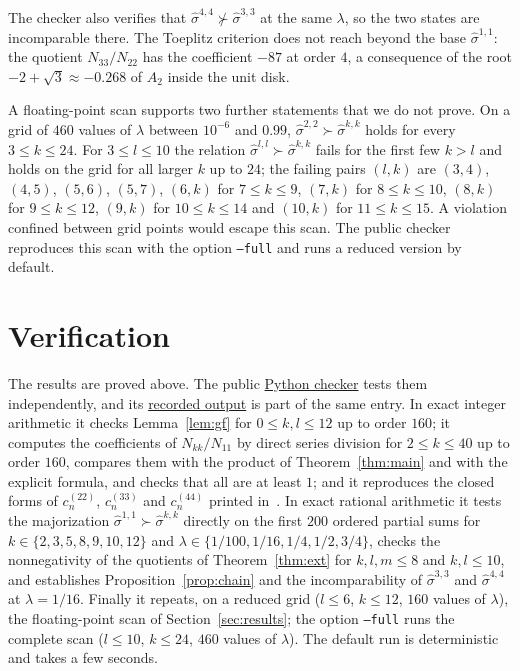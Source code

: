 \documentclass[11pt,a4paper]{article}
\theoremstyle{definition}
\theoremstyle{plain}
\newcommand{\sig}[2]{\hat\sigma^{#1,#2}}
\begin{document}
The checker also verifies that $\sig44\not\succ\sig33$ at the same $\lambda$,
so the two states are incomparable there. The Toeplitz criterion does not
reach beyond the base $\sig11$: the quotient $N_{33}/N_{22}$ has the
coefficient $-87$ at order $4$, a consequence of the root
$-2+\sqrt3\approx-0.268$ of $A_2$ inside the unit disk.

A floating-point scan supports two further statements that we do not prove. On
a grid of $460$ values of $\lambda$ between $10^{-6}$ and $0.99$, $\sig22\succ\sig kk$
holds for every $3\le k\le24$. For $3\le l\le10$ the relation $\sig ll\succ\sig kk$
fails for the first few $k>l$ and holds on the grid for all larger $k$ up to
$24$; the failing pairs $(l,k)$ are $(3,4)$, $(4,5)$, $(5,6)$, $(5,7)$, $(6,k)$
for $7\le k\le9$, $(7,k)$ for $8\le k\le10$, $(8,k)$ for $9\le k\le12$, $(9,k)$
for $10\le k\le14$ and $(10,k)$ for $11\le k\le15$. A violation confined
between grid points would escape this scan. The public checker reproduces
this scan with the option \texttt{--full} and runs a reduced version by default.

\section{Verification}\label{sec:verification}
The results are proved above. The public
\href{https://github.com/jpbruneton/open_quantum_problems/blob/main/research/entries/photon-added-squeezed-majorization/checks/verify_majorization.py}{Python checker}
tests them independently, and its
\href{https://github.com/jpbruneton/open_quantum_problems/blob/main/research/entries/photon-added-squeezed-majorization/data/verification.json}{recorded output}
is part of the same entry. In exact integer arithmetic it checks
Lemma~\ref{lem:gf} for $0\le k,l\le12$ up to order $160$; it computes the
coefficients of $N_{kk}/N_{11}$ by direct series division for $2\le k\le40$ up
to order $160$, compares them with the product of Theorem~\ref{thm:main} and
with the explicit formula, and checks that all are at least $1$; and it
reproduces the closed forms of $c^{(22)}_n$, $c^{(33)}_n$ and $c^{(44)}_n$
printed in~\cite{VanHerstraeten2024}. In exact rational arithmetic it tests the
majorization $\sig11\succ\sig kk$ directly on the first $200$ ordered partial
sums for $k\in\{2,3,5,8,9,10,12\}$ and
$\lambda\in\{1/100,1/16,1/4,1/2,3/4\}$, checks the nonnegativity of the
quotients of Theorem~\ref{thm:ext} for $k,l,m\le8$ and $k,l\le10$, and
establishes Proposition~\ref{prop:chain} and the incomparability of
$\sig33$ and $\sig44$ at $\lambda=1/16$. Finally it repeats, on a reduced grid
($l\le6$, $k\le12$, $160$ values of $\lambda$), the floating-point scan of
Section~\ref{sec:results}; the option \texttt{--full} runs the complete scan
($l\le10$, $k\le24$, $460$ values of $\lambda$). The default run is
deterministic and takes a few seconds.
\end{document}
